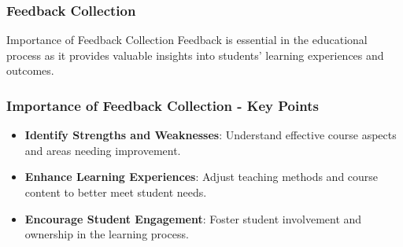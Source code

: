 \documentclass{beamer}
\begin{document}
\begin{frame}[fragile]
    \frametitle{Feedback Collection}
    \begin{block}{Importance of Feedback Collection}
        Feedback is essential in the educational process as it provides valuable insights into students' learning experiences and outcomes. 
    \end{block}
\end{frame}

\begin{frame}[fragile]
    \frametitle{Importance of Feedback Collection - Key Points}
    \begin{itemize}
        \item \textbf{Identify Strengths and Weaknesses}: Understand effective course aspects and areas needing improvement.
        \item \textbf{Enhance Learning Experiences}: Adjust teaching methods and course content to better meet student needs.
        \item \textbf{Encourage Student Engagement}: Foster student involvement and ownership in the learning process.
    \end{itemize}
\end{frame}
\end{document}
